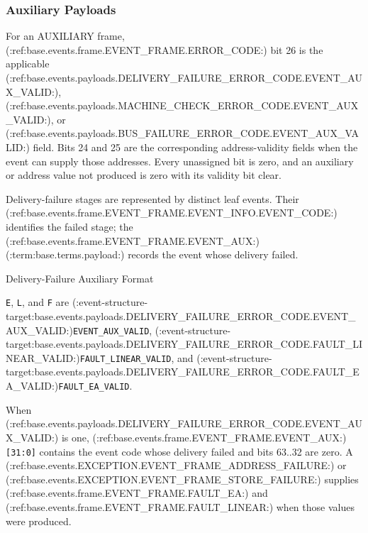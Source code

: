 \subsubsection{Auxiliary Payloads}
For an AUXILIARY frame, (:ref:base.events.frame.EVENT_FRAME.ERROR_CODE:) bit 26 is the applicable
(:ref:base.events.payloads.DELIVERY_FAILURE_ERROR_CODE.EVENT_AUX_VALID:),
(:ref:base.events.payloads.MACHINE_CHECK_ERROR_CODE.EVENT_AUX_VALID:), or
(:ref:base.events.payloads.BUS_FAILURE_ERROR_CODE.EVENT_AUX_VALID:) field. Bits 24 and 25 are the corresponding address-validity fields when the event can supply those addresses. Every
unassigned bit is zero, and an auxiliary or address value not produced is zero with its validity bit clear.

Delivery-failure stages are represented by distinct leaf events. Their (:ref:base.events.frame.EVENT_FRAME.EVENT_INFO.EVENT_CODE:) identifies the failed stage; the
(:ref:base.events.frame.EVENT_FRAME.EVENT_AUX:) (:term:base.terms.payload:) records the event whose delivery failed.

\begin{BedrockListedFormatDiagram}{Delivery-Failure Auxiliary Format}
\end{BedrockListedFormatDiagram}
{\small
\texttt{E}, \texttt{L}, and \texttt{F} are (:event-structure-target:base.events.payloads.DELIVERY_FAILURE_ERROR_CODE.EVENT_AUX_VALID:)\texttt{EVENT\_AUX\_VALID},
(:event-structure-target:base.events.payloads.DELIVERY_FAILURE_ERROR_CODE.FAULT_LINEAR_VALID:)\texttt{FAULT\_LINEAR\_VALID}, and (:event-structure-target:base.events.payloads.DELIVERY_FAILURE_ERROR_CODE.FAULT_EA_VALID:)\texttt{FAULT\_EA\_VALID}.
\par}

When (:ref:base.events.payloads.DELIVERY_FAILURE_ERROR_CODE.EVENT_AUX_VALID:) is one, (:ref:base.events.frame.EVENT_FRAME.EVENT_AUX:)\texttt{[31:0]} contains the event code whose delivery failed and bits 63..32 are zero. A
(:ref:base.events.EXCEPTION.EVENT_FRAME_ADDRESS_FAILURE:) or (:ref:base.events.EXCEPTION.EVENT_FRAME_STORE_FAILURE:) supplies (:ref:base.events.frame.EVENT_FRAME.FAULT_EA:) and (:ref:base.events.frame.EVENT_FRAME.FAULT_LINEAR:)
when those values were produced.

